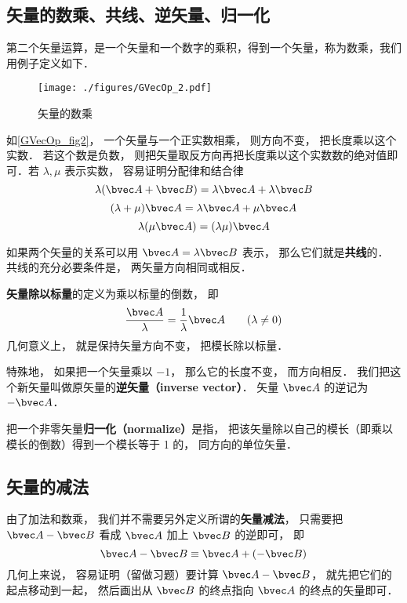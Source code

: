 \subsection{矢量的数乘、共线、逆矢量、归一化}
第二个矢量运算，是一个矢量和一个数字的乘积，得到一个矢量，称为数乘，我们用例子定义如下．

\begin{figure}[ht]
\centering
\texttt{[image: ./figures/GVecOp\_2.pdf]}
\caption{矢量的数乘} \label{GVecOp_fig2}
\end{figure}

如\autoref{GVecOp_fig2}， 一个矢量与一个正实数相乘， 则方向不变， 把长度乘以这个实数． 若这个数是负数， 则把矢量取反方向再把长度乘以这个实数数的绝对值即可．若 $\lambda, \mu$ 表示实数， 容易证明分配律和结合律
\begin{equation}
\lambda(\bvec A + \bvec B) = \lambda\bvec A + \lambda\bvec B
\end{equation}
\begin{equation}
(\lambda+\mu)\bvec A = \lambda\bvec A + \mu\bvec A
\end{equation}
\begin{equation}
\lambda(\mu\bvec A) = (\lambda\mu) \bvec A
\end{equation}

如果两个矢量的关系可以用 $\bvec A = \lambda\bvec B$ 表示， 那么它们就是\textbf{共线}的． 共线的充分必要条件是， 两矢量方向相同或相反．

\textbf{矢量除以标量}的定义为乘以标量的倒数， 即
\begin{equation}
\frac{\bvec A}{\lambda} = \frac{1}{\lambda} \bvec A \qquad (\lambda \ne 0)
\end{equation}
几何意义上， 就是保持矢量方向不变， 把模长除以标量．

特殊地， 如果把一个矢量乘以 $-1$， 那么它的长度不变， 而方向相反． 我们把这个新矢量叫做原矢量的\textbf{逆矢量（inverse vector）}． 矢量 $\bvec A$ 的逆记为 $-\bvec A$．

把一个非零矢量\textbf{归一化（normalize）}是指， 把该矢量除以自己的模长（即乘以模长的倒数）得到一个模长等于 1 的， 同方向的单位矢量．

\subsection{矢量的减法}
由了加法和数乘， 我们并不需要另外定义所谓的\textbf{矢量减法}， 只需要把 $\bvec A - \bvec B$ 看成 $\bvec A$ 加上 $\bvec B$ 的逆即可， 即
\begin{equation}
\bvec A - \bvec B \equiv \bvec A + (-\bvec B)
\end{equation}
几何上来说， 容易证明（留做习题）要计算 $\bvec A - \bvec B$， 就先把它们的起点移动到一起， 然后画出从 $\bvec B$ 的终点指向 $\bvec A$ 的终点的矢量即可．

